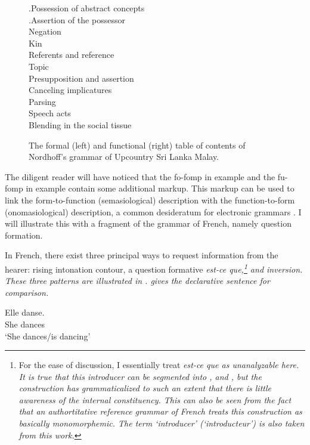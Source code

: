 \begin{figure}
{.\hspace{.5cm}Possession of abstract concepts \\
.\hspace{.5cm}Assertion of the possessor \\
Negation\\
Kin\\
Referents and reference\\
Topic\\
Presupposition and assertion\\
Canceling implicatures\\
Parsing\\
Speech acts\\
Blending in the social tissue\\
}
\caption{The formal (left) and functional (right) table of contents of Nordhoff's grammar of Upcountry Sri Lanka Malay.}
\label{fig:nordhoff}
\end{figure}
 
The diligent reader will have noticed that the fo-fomp in example  and the fu-fomp in example  contain some additional markup. This markup can be used to link the form-to-function (semasiological) description with the function-to-form (onomasiological) description, a common desideratum for electronic grammars \citep{Comrie1998,Lehmann1998,Zaefferer1998,Mosel2006craft,Nordhoff2008jldc}. I will illustrate this with a fragment of the grammar of French, namely question formation.

In French, there exist three principal ways to request information from the hearer:  rising intonation contour, a question formative \em est-ce que\em,\footnote{For 
 the ease of discussion, I essentially treat \em est-ce que \em as unanalyzable here. It is true that this introducer can be segmented into ,  and , but the construction has grammaticalized to such an extent that there is little awareness of the internal constituency. This can also be seen from the fact that an authortitative reference grammar of French \citep{GrevisseEtAl1995} treats this construction as basically monomorphemic. The term `introducer' (`introducteur') is also taken from this work.
} 
and inversion. These three patterns are illustrated in .  gives the declarative sentence for comparison.

\ea\label{ex:frenchquestions:assertion}
\gll Elle danse.\\
     She dances\\
    `She dances/is dancing'
\z
 
